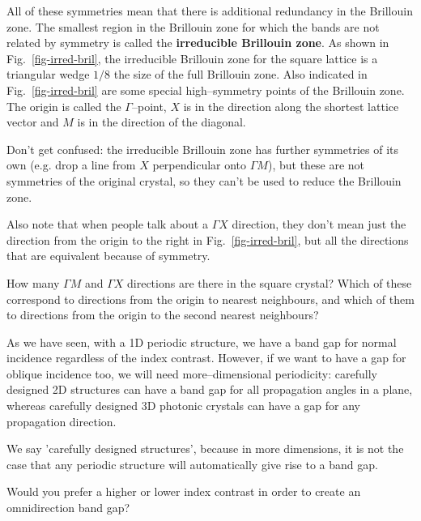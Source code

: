 All of these symmetries mean that there is additional redundancy in the Brillouin zone. The smallest region in the Brillouin zone for which the bands are not related by symmetry is called the \textbf{irreducible Brillouin zone}. As shown in Fig.~\ref{fig-irred-bril}, the irreducible Brillouin zone for the square lattice is a triangular wedge $1/8$ the size of the full Brillouin zone. Also indicated in Fig.~\ref{fig-irred-bril} are some special high--symmetry points of the Brillouin zone. The origin is called the $\Gamma$--point, $X$ is in the direction along the shortest lattice vector and $M$ is in the direction of the diagonal.

Don't get confused: the irreducible Brillouin zone has further symmetries of its own (e.g. drop a line from $X$ perpendicular onto $\Gamma M$), but these are not symmetries of the original crystal, so they can't be used to reduce the Brillouin zone.

Also note that when people talk about a $\Gamma X$ direction, they don't mean just the direction from the origin to the right in Fig.~\ref{fig-irred-bril}, but all the directions that are equivalent because of symmetry.

\begin{exer}
How many $\Gamma M$ and $\Gamma X$ directions are there in the square crystal? Which of these correspond to directions from the origin to nearest neighbours, and which of them to directions from the origin to the second nearest neighbours?
\end{exer}

\pagebreak


As we have seen, with a 1D periodic structure, we have a band gap for normal incidence regardless of the index contrast. However, if we want to have a gap for oblique incidence too, we will need more--dimensional periodicity: carefully designed 2D structures can have a band gap for all propagation angles in a plane, whereas carefully designed 3D photonic crystals can have a gap for any propagation direction.

We say 'carefully designed structures', because in more dimensions, it is not the case that any periodic structure will automatically give rise to a band gap.

\begin{cue}
Would you prefer a higher or lower index contrast in order to create an omnidirection band gap?
\end{cue}

